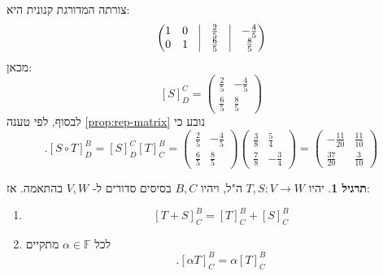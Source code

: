 \documentclass[12pt]{report}
\theoremstyle{plain}
\theoremstyle{definition}
\newtheorem{exercise}{תרגיל}[chapter]
\newcommand{\F}{\mathbb{F}}
\newcommand{\0}{\mathbf{0}}
\begin{document}
צורתה המדורגת קנונית היא:
$$
\begin{pmatrix}
1 & 0 & \vline & \frac{2}{5} & \vline & -\frac{4}{5} \\
0 & 1 & \vline & \frac{6}{5} & \vline & \frac{8}{5}
\end{pmatrix}
$$
מכאן:
$$
[S]_D^C=\begin{pmatrix}
\frac{2}{5} & -\frac{4}{5} \\
\frac{6}{5} & \frac{8}{5}
\end{pmatrix}
$$
לבסוף, לפי טענה 
\ref{prop:rep-matrix}
נובע כי
$$
.[S\circ T]_D^B=[S]_D^C[T]_C^B=\begin{pmatrix}
\frac{2}{5} & -\frac{4}{5} \\
\frac{6}{5} & \frac{8}{5}
\end{pmatrix}\begin{pmatrix}
\frac{3}{8} & \frac{5}{4} \\
\frac{7}{8} & -\frac{3}{4}
\end{pmatrix}=\begin{pmatrix}
-\frac{11}{20} & \frac{11}{10} \\
\frac{37}{20} & \frac{3}{10}
\end{pmatrix}
$$

\begin{exercise}
יהיו
$T,S:V\to W$
ה"ל, ויהיו
$B,C$
בסיסים סדורים ל-
$V,W$
בהתאמה. אז:
\begin{enumerate}[label=\alph*.]
\item 
$$
[T+S]_C^B=[T]_C^B+[S]_C^B
$$


\item 
לכל
$\alpha\in\F$
מתקיים
$$
.[\alpha T]_C^B=\alpha[T]_C^B
$$


\end{enumerate}
\end{exercise}
\end{document}

